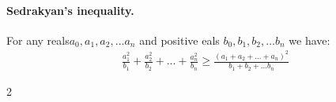 \documentclass{article}
\begin{document}
\begin{multicols*}{2}
  \paragraph{Sedrakyan's inequality.} For any reals$a_{0},a_{1},a_{2},\ldots a_{n}$ and positive eals $b_{0},b_{1},b_{2},\ldots b_{n}$ we have:  
  \begin{equation*}
    \begin{split}
      \frac{a_{1}^2}{b_{1}}+\frac{a_{2}^2}{b_{2}}+ ...+ \frac{a_{n}^2}{b_{n}} \ge \frac{\left( a_{1}+ a_{2} + ... + a_{n}  \right)^{2}}{b_{1}+b_{2}+... b_{n}}  
    \end{split}
  \end{equation*}
\end{multicols*}{2}
\end{document}
